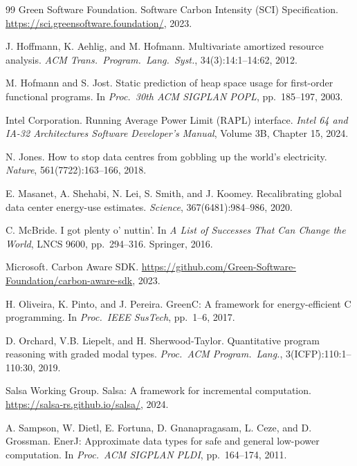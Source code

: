 \documentclass[11pt,a4paper]{article}
\begin{document}
\begin{thebibliography}{99}
Green Software Foundation.
\newblock Software Carbon Intensity (SCI) Specification.
\newblock \url{https://sci.greensoftware.foundation/}, 2023.

J. Hoffmann, K. Aehlig, and M. Hofmann.
\newblock Multivariate amortized resource analysis.
\newblock \emph{ACM Trans.\ Program.\ Lang.\ Syst.}, 34(3):14:1--14:62, 2012.

M. Hofmann and S. Jost.
\newblock Static prediction of heap space usage for first-order functional
  programs.
\newblock In \emph{Proc.\ 30th ACM SIGPLAN POPL}, pp.\ 185--197, 2003.

Intel Corporation.
\newblock Running Average Power Limit (RAPL) interface.
\newblock \emph{Intel 64 and IA-32 Architectures Software Developer's Manual},
  Volume 3B, Chapter 15, 2024.

N. Jones.
\newblock How to stop data centres from gobbling up the world's electricity.
\newblock \emph{Nature}, 561(7722):163--166, 2018.

E. Masanet, A. Shehabi, N. Lei, S. Smith, and J. Koomey.
\newblock Recalibrating global data center energy-use estimates.
\newblock \emph{Science}, 367(6481):984--986, 2020.

C. McBride.
\newblock I got plenty o' nuttin'.
\newblock In \emph{A List of Successes That Can Change the World},
  LNCS 9600, pp.\ 294--316. Springer, 2016.

Microsoft.
\newblock Carbon Aware SDK.
\newblock \url{https://github.com/Green-Software-Foundation/carbon-aware-sdk},
  2023.

H. Oliveira, K. Pinto, and J. Pereira.
\newblock GreenC: A framework for energy-efficient C programming.
\newblock In \emph{Proc.\ IEEE SusTech}, pp.\ 1--6, 2017.

D. Orchard, V.B. Liepelt, and H. Sherwood-Taylor.
\newblock Quantitative program reasoning with graded modal types.
\newblock \emph{Proc.\ ACM Program.\ Lang.}, 3(ICFP):110:1--110:30, 2019.

Salsa Working Group.
\newblock Salsa: A framework for incremental computation.
\newblock \url{https://salsa-rs.github.io/salsa/}, 2024.

A. Sampson, W. Dietl, E. Fortuna, D. Gnanapragasam, L. Ceze, and
  D. Grossman.
\newblock EnerJ: Approximate data types for safe and general low-power
  computation.
\newblock In \emph{Proc.\ ACM SIGPLAN PLDI}, pp.\ 164--174, 2011.


\end{thebibliography}
\end{document}
